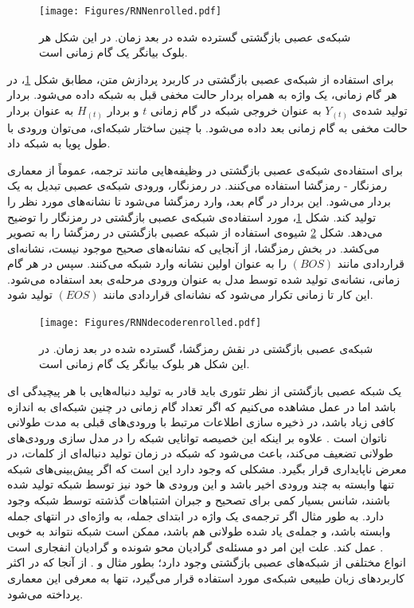  \begin{figure}[!htb]
	\centering
	\texttt{[image: Figures/RNNenrolled.pdf]}
	\caption[شبکه‌ی عصبی بازگشتی گسترده شده در بعد زمان]{شبکه‌ی عصبی بازگشتی گسترده شده در بعد زمان. در این شکل هر بلوک بیانگر یک گام زمانی است.}
	\label{Fig:RNNenrolled}
\end{figure}
برای استفاده از شبکه‌ی عصبی بازگشتی در کاربرد پردازش متن، مطابق شکل \ref{Fig:RNNenrolled}، در هر گام زمانی، یک واژه به همراه بردار حالت مخفی قبل به شبکه داده می‌شود. بردار تولید شده‌ی $Y_{(t)}$ به عنوان خروجی شبکه در گام زمانی $t$ و بردار $H_{(t)}$ به عنوان بردار حالت مخفی به گام زمانی بعد داده می‌شود. با چنین ساختار شبکه‌ای، می‌توان ورودی با طول پویا به شبکه داد.


برای استفاده‌ی شبکه‌ی عصبی بازگشتی در وظیفه‌هایی مانند ترجمه، عموماً از معماری رمزنگار - رمزگشا استفاده می‌کنند. در رمزنگار، ورودی شبکه‌ی عصبی تبدیل به یک بردار می‌شود. این بردار در گام بعد، وارد رمزگشا می‌شود تا نشانه‌های مورد نظر را تولید کند. شکل \ref{Fig:RNNenrolled}، مورد استفاده‌ی شبکه‌ی عصبی بازگشتی در رمزنگار را توضیح می‌دهد. شکل \ref{Fig:RNNdecoderenrolled} شیوه‌ی استفاده از شبکه عصبی بازگشتی در رمزگشا را به تصویر می‌کشد. در بخش رمزگشا، از آنجایی که نشانه‌های صحیح موجود نیست، نشانه‌ای قراردادی مانند $(BOS)$ را به عنوان اولین نشانه وارد شبکه می‌کنند. سپس در هر گام زمانی، نشانه‌ی تولید شده توسط مدل به عنوان ورودی مرحله‌ی بعد استفاده می‌شود. این کار تا زمانی تکرار می‌شود که نشانه‌ای قراردادی مانند $(EOS)$ تولید شود.
 \begin{figure}[!htb]
	\centering
	\texttt{[image: Figures/RNNdecoderenrolled.pdf]}
	\caption[شبکه‌ی عصبی بازگشتی در نقش رمزگشا، گسترده شده در بعد زمان]{شبکه‌ی عصبی بازگشتی در نقش رمزگشا، گسترده شده در بعد زمان. در این شکل هر بلوک بیانگر یک گام زمانی است.}
	\label{Fig:RNNdecoderenrolled}
\end{figure}

یک شبکه عصبی بازگشتی از نظر تئوری باید قادر به تولید دنباله‌هایی با هر پیچیدگی ای باشد اما در عمل مشاهده می‌کنیم که اگر تعداد گام زمانی در چنین شبکه‌ای به اندازه کافی زیاد باشد، در ذخیره سازی اطلاعات مرتبط با ورودی‌های قبلی به مدت طولانی ناتوان است \cite{RNNGradientProblem}.
علاوه بر اینکه این خصیصه توانایی شبکه را در مدل سازی ورودی‌های طولانی تضعیف می‌کند، باعث می‌شود که شبکه در زمان تولید دنباله‌ای از کلمات، در معرض ناپایداری قرار بگیرد. مشکلی که وجود دارد این است که اگر پیش‌بینی‌های شبکه تنها وابسته به چند ورودی اخیر باشد و این ورودی ها خود نیز توسط شبکه تولید شده باشند، شانس بسیار کمی برای تصحیح و جبران اشتباهات گذشته توسط شبکه وجود دارد. به طور مثال اگر ترجمه‌ی یک واژه در ابتدای جمله، به واژه‌ای در انتهای جمله وابسته باشد، و جمله‌ی یاد شده طولانی هم باشد، ممکن است شبکه نتواند به خوبی عمل کند. علت این امر دو مسئله‌ی گرادیان محو شونده و گرادیان انفجاری است \cite{VanishingGradient}.
\\
انواع مختلفی از شبکه‌های عصبی بازگشتی وجود دارد؛ بطور مثال  و  . از آنجا که در اکثر کاربرد‌های زبان طبیعی شبکه‌ی  مورد استفاده قرار می‌گیرد، تنها به معرفی این معماری پرداخته می‌شود.

